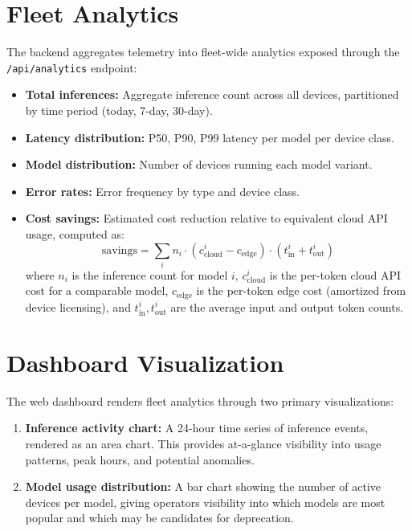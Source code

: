 \documentclass[12pt, letterpaper, twoside]{report}
\begin{document}
\section{Fleet Analytics}
\label{sec:fleet_analytics}

The backend aggregates telemetry into fleet-wide analytics exposed through the \texttt{/api/analytics} endpoint:

\begin{itemize}[itemsep=1pt, topsep=2pt, parsep=0pt]
\item \textbf{Total inferences:} Aggregate inference count across all devices, partitioned by time period (today, 7-day, 30-day).
\item \textbf{Latency distribution:} P50, P90, P99 latency per model per device class.
\item \textbf{Model distribution:} Number of devices running each model variant.
\item \textbf{Error rates:} Error frequency by type and device class.
\item \textbf{Cost savings:} Estimated cost reduction relative to equivalent cloud API usage, computed as:
\begin{equation}
\text{savings} = \sum_i n_i \cdot (c_{\text{cloud}}^i - c_{\text{edge}}) \cdot (t_{\text{in}}^i + t_{\text{out}}^i)
\end{equation}
where $n_i$ is the inference count for model $i$, $c_{\text{cloud}}^i$ is the per-token cloud API cost for a comparable model, $c_{\text{edge}}$ is the per-token edge cost (amortized from device licensing), and $t_{\text{in}}^i, t_{\text{out}}^i$ are the average input and output token counts.
\end{itemize}

\section{Dashboard Visualization}
\label{sec:dashboard_viz}

The web dashboard renders fleet analytics through two primary visualizations:

\begin{enumerate}[itemsep=3pt]
\item \textbf{Inference activity chart:} A 24-hour time series of inference events, rendered as an area chart. This provides at-a-glance visibility into usage patterns, peak hours, and potential anomalies.
\item \textbf{Model usage distribution:} A bar chart showing the number of active devices per model, giving operators visibility into which models are most popular and which may be candidates for deprecation.
\end{enumerate}
\end{document}
